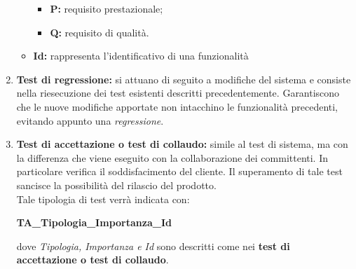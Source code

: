 \begin{enumerate}
\begin{itemize}
\begin{itemize}
		\item \textbf{P:} requisito prestazionale;
		\item \textbf{Q:} requisito di qualità.
\end{itemize}
	\item \textbf{Id:} rappresenta l'identificativo di una funzionalità		 
\end{itemize}
	\item \textbf{Test di regressione:} si attuano di seguito a modifiche del sistema e consiste nella riesecuzione dei test esistenti descritti precedentemente. Garantiscono che le nuove modifiche apportate non intacchino le funzionalità precedenti, evitando appunto una \textit{regressione}.
	\item \textbf{Test di accettazione o test di collaudo:} simile al test di sistema, ma con la differenza che viene eseguito con la collaborazione dei committenti. In particolare verifica il soddisfacimento del cliente. Il superamento di tale test sancisce la possibilità del rilascio del prodotto.\\
	Tale tipologia di test verrà indicata con:
\begin{center}
	\textbf{TA\_Tipologia\_Importanza\_Id}
\end{center}
dove \textit{Tipologia, Importanza e Id} sono descritti come nei \textbf{test di accettazione o test di collaudo}.

	
\end{enumerate}
